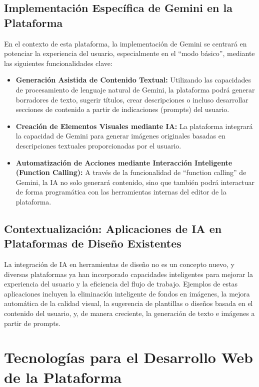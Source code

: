 \documentclass[12pt,a4paper]{report}
\begin{document}
\subsection{Implementación Específica de Gemini en la Plataforma}

En el contexto de esta plataforma, la implementación de Gemini se centrará en potenciar la experiencia del usuario, especialmente en el ``modo básico'', mediante las siguientes funcionalidades clave:

\begin{itemize}
\item \textbf{Generación Asistida de Contenido Textual:} Utilizando las capacidades de procesamiento de lenguaje natural de Gemini, la plataforma podrá generar borradores de texto, sugerir títulos, crear descripciones o incluso desarrollar secciones de contenido a partir de indicaciones (prompts) del usuario.

\item \textbf{Creación de Elementos Visuales mediante IA:} La plataforma integrará la capacidad de Gemini para generar imágenes originales basadas en descripciones textuales proporcionadas por el usuario.

\item \textbf{Automatización de Acciones mediante Interacción Inteligente (Function Calling):} A través de la funcionalidad de ``function calling'' de Gemini, la IA no solo generará contenido, sino que también podrá interactuar de forma programática con las herramientas internas del editor de la plataforma.
\end{itemize}

\subsection{Contextualización: Aplicaciones de IA en Plataformas de Diseño Existentes}

La integración de IA en herramientas de diseño no es un concepto nuevo, y diversas plataformas ya han incorporado capacidades inteligentes para mejorar la experiencia del usuario y la eficiencia del flujo de trabajo. Ejemplos de estas aplicaciones incluyen la eliminación inteligente de fondos en imágenes, la mejora automática de la calidad visual, la sugerencia de plantillas o diseños basada en el contenido del usuario, y, de manera creciente, la generación de texto e imágenes a partir de prompts.

\section{Tecnologías para el Desarrollo Web de la Plataforma}
\end{document}
